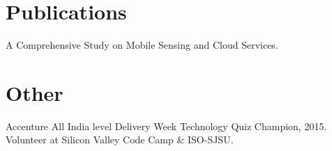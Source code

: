 \documentclass[margin]{res}
\begin{document}
\begin{resume}
\section{Publications}
 A Comprehensive Study on Mobile Sensing and Cloud Services. \\

\section{Other}
 Accenture All India level Delivery Week Technology Quiz Champion, 2015. \\
 Volunteer at Silicon Valley Code Camp & ISO-SJSU. \\


\end{resume}
\end{document}
